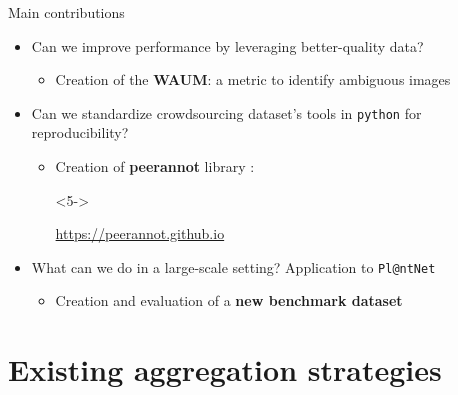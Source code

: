 \begin{frame}{Main contributions}{}

\begin{itemize}[itemsep=20pt]
    \item<1-> Can we improve performance by leveraging better-quality data?
    \begin{itemize}
        \item<4-> Creation of the \textbf{WAUM}: a metric to identify ambiguous images %
    \end{itemize}
    \item<2-> Can we standardize crowdsourcing dataset's tools in \texttt{python} for reproducibility?
        \begin{itemize}
            \item<5-> Creation of \textbf{peerannot} library :
            \begin{onlyenv}<5->
                \begin{center}
                    \url{https://peerannot.github.io}
                \end{center}
            \end{onlyenv}
        \end{itemize}
    \item<3-> What can we do in a large-scale setting? Application to \texttt{Pl@ntNet}
        \begin{itemize}
            \item<6-> Creation and evaluation of a \textbf{new benchmark dataset}
        \end{itemize}
\end{itemize}

\end{frame}

\section{Existing aggregation strategies}


